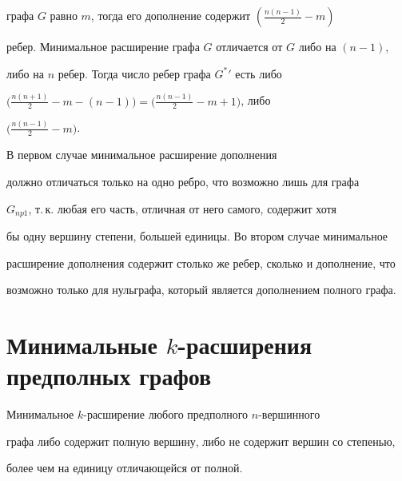 графа $G$ равно $m$, тогда его дополнение содержит $(\frac{n(n-1)}{2} - m)$


ребер. Минимальное расширение графа $G$ отличается от $G$ либо на $(n-1)$,


либо на $n$ ребер. Тогда число ребер графа $G^*{}'$ есть либо


$\big(\frac{n(n+1)}{2}-m-(n-1)\big)=\big(\frac{n(n-1)}{2}-m+1\big)$, либо


$\big(\frac{n(n-1)}{2}-m\big)$.


В первом случае минимальное расширение дополнения


должно отличаться только на одно ребро, что возможно лишь для графа


$G_{np1}$, т.\,к. любая его часть, отличная от него самого, содержит хотя


бы одну вершину степени, большей единицы. Во втором случае минимальное


расширение дополнения содержит столько же ребер, сколько и дополнение, что


возможно только для нульграфа, который является дополнением полного графа.








\section{Минимальные $k$-расширения предполных графов}





\begin{lem}


Минимальное $k$-расширение любого предполного $n$-вершинного


графа либо содержит полную вершину, либо не содержит вершин со степенью,


более чем на единицу отличающейся от полной.


\end{lem}





